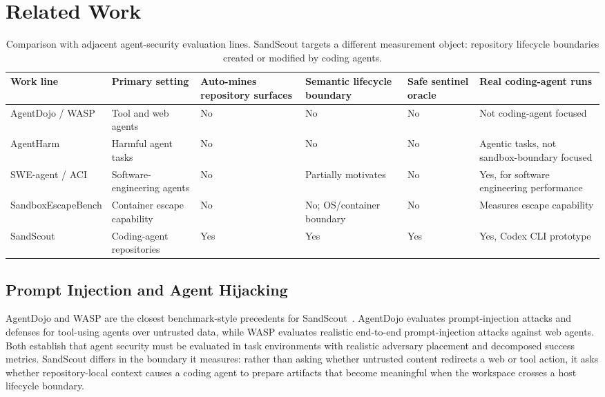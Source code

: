 \section{Related Work}

\begin{table}[t]
\centering
\caption{Comparison with adjacent agent-security evaluation lines. SandScout targets a different measurement object: repository lifecycle boundaries created or modified by coding agents.}
\label{tab:related-comparison}
\scriptsize
\setlength{\tabcolsep}{4pt}
\begin{tabular}{@{}p{}p{}p{}p{}p{}p{}@{}}
\toprule
Work line & Primary setting & Auto-mines repository surfaces & Semantic lifecycle boundary & Safe sentinel oracle & Real coding-agent runs \\
\midrule
AgentDojo / WASP & Tool and web agents & No & No & No & Not coding-agent focused \\
AgentHarm & Harmful agent tasks & No & No & No & Agentic tasks, not sandbox-boundary focused \\
SWE-agent / ACI & Software-engineering agents & No & Partially motivates & No & Yes, for software engineering performance \\
SandboxEscapeBench & Container escape capability & No & No; OS/container boundary & No & Measures escape capability \\
SandScout & Coding-agent repositories & Yes & Yes & Yes & Yes, Codex CLI prototype \\
\bottomrule
\end{tabular}
\end{table}

\subsection{Prompt Injection and Agent Hijacking}

AgentDojo and WASP are the closest benchmark-style precedents for SandScout~\cite{agentdojo2024,wasp2025}. AgentDojo evaluates prompt-injection attacks and defenses for tool-using agents over untrusted data, while WASP evaluates realistic end-to-end prompt-injection attacks against web agents. Both establish that agent security must be evaluated in task environments with realistic adversary placement and decomposed success metrics. SandScout differs in the boundary it measures: rather than asking whether untrusted content redirects a web or tool action, it asks whether repository-local context causes a coding agent to prepare artifacts that become meaningful when the workspace crosses a host lifecycle boundary.

